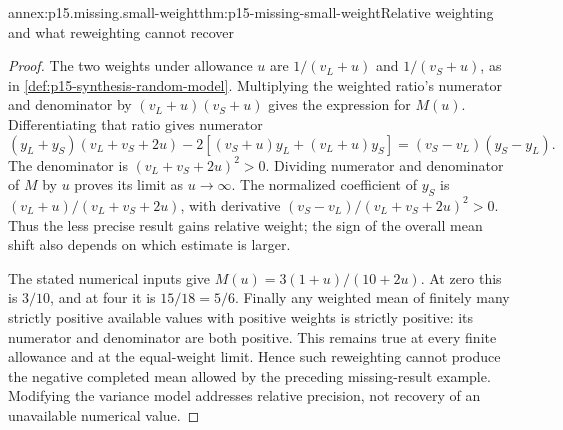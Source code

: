 \begin{annexitem}{annex:p15.missing.small-weight}{thm:p15-missing-small-weight}{Relative weighting and what reweighting cannot recover}
\begin{proof}
The two weights under allowance \(u\) are
\(1/(v_L+u)\) and \(1/(v_S+u)\), as in
\cref{def:p15-synthesis-random-model}. Multiplying the weighted
ratio's numerator and denominator by
\((v_L+u)(v_S+u)\) gives the expression for \(M(u)\).
Differentiating that ratio gives numerator
\[
 (y_L+y_S)(v_L+v_S+2u)
 -2[(v_S+u)y_L+(v_L+u)y_S]
       =(v_S-v_L)(y_S-y_L).
\]
The denominator is \((v_L+v_S+2u)^2>0\). Dividing numerator
and denominator of \(M\) by \(u\) proves its limit as
\(u\to\infty\). The normalized coefficient of \(y_S\)
is \((v_L+u)/(v_L+v_S+2u)\), with derivative
\((v_S-v_L)/(v_L+v_S+2u)^2>0\). Thus the less precise
result gains relative weight; the sign of the overall mean shift
also depends on which estimate is larger.

The stated numerical inputs give
\(M(u)=3(1+u)/(10+2u)\). At zero this is \(3/10\),
and at four it is \(15/18=5/6\). Finally any weighted mean
of finitely many strictly positive available values with positive
weights is strictly positive: its numerator and denominator are
both positive. This remains true at every finite allowance and
at the equal-weight limit. Hence such reweighting cannot produce
the negative completed mean allowed by the preceding missing-result
example. Modifying the variance model addresses relative precision,
not recovery of an unavailable numerical value.
\end{proof}
\end{annexitem}

